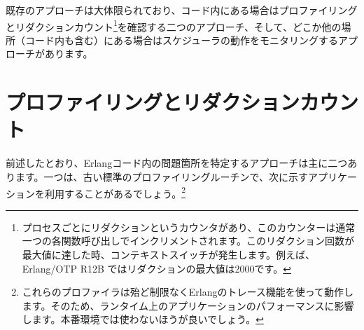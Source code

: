 既存のアプローチは大体限られており、コード内にある場合はプロファイリングとリダクションカウント\footnote{プロセスごとにリダクションというカウンタがあり、このカウンターは通常一つの各関数呼び出しでインクリメントされます。このリダクション回数が最大値に達した時、コンテキストスイッチが発生します。例えば、 Erlang/OTP R12B ではリダクションの最大値は2000です。}を確認する二つのアプローチ、そして、どこか他の場所（コード内も含む）にある場合はスケジューラの動作をモニタリングするアプローチがあります。

\section{プロファイリングとリダクションカウント}
\label{sec:cpu-profiling}

前述したとおり、Erlangコード内の問題箇所を特定するアプローチは主に二つあります。一つは、古い標準のプロファイリングルーチンで、次に示すアプリケーションを利用することがあるでしょう。\footnote{これらのプロファイラは殆ど制限なくErlangのトレース機能を使って動作します。そのため、ランタイム上のアプリケーションのパフォーマンスに影響します。本番環境では使わないほうが良いでしょう。}

